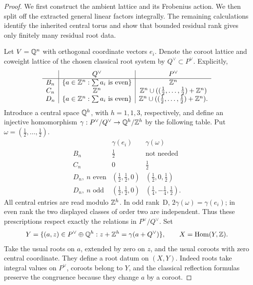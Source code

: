 \begin{proof}
We first construct the ambient lattice and its Frobenius action.
We then split off the extracted general linear factors integrally.
The remaining calculations identify the inherited central torus
and show that bounded residual rank gives only finitely many
residual root data.

Let \(V=\mathbb Q^n\) with orthogonal coordinate vectors \(e_i\).  Denote
the coroot lattice and coweight lattice of the chosen classical root
system by \(Q^\vee\subset P^\vee\).  Explicitly,
\[
\begin{array}{c|c|c}
 &Q^\vee&P^\vee\\ \hline
 B_n&\{a\in\mathbb Z^n:\sum a_i\text{ is even}\}&\mathbb Z^n\\
 C_n&\mathbb Z^n&\mathbb Z^n\cup((\tfrac12,\ldots,\tfrac12)+\mathbb Z^n)\\
 D_n&\{a\in\mathbb Z^n:\sum a_i\text{ is even}\}
     &\mathbb Z^n\cup((\tfrac12,\ldots,\tfrac12)+\mathbb Z^n).
\end{array}
\]
Introduce a central space \(\mathbb Q^h\), with \(h=1,1,3\), respectively,
and define an injective homomorphism
\(\gamma:P^\vee/Q^\vee\to\mathbb Q^h/\mathbb Z^h\) by the following table.
Put \(\omega=(\tfrac12,\ldots,\tfrac12)\).
\begin{equation}\label{fam:lattice-glue}
\begin{array}{c|c|c}
 &\gamma(e_i)&\gamma(\omega)\\ \hline
 B_n&\tfrac12&\text{not needed}\\
 C_n&0&\tfrac12\\
 D_n,\ n\text{ even}&(\tfrac12,\tfrac12,0)
                         &(\tfrac12,0,\tfrac12)\\
 D_n,\ n\text{ odd}&(\tfrac12,\tfrac12,0)
                         &(\tfrac14,-\tfrac14,\tfrac12).
\end{array}
\end{equation}
All central entries are read modulo \(\mathbb Z^h\).  In odd rank~D,
\(2\gamma(\omega)=\gamma(e_i)\); in even rank the two displayed
classes of order two are independent.  Thus these prescriptions
respect exactly the relations in \(P^\vee/Q^\vee\).
Set
\begin{equation}\label{fam:Y}
 Y=\{(a,z)\in P^\vee\oplus\mathbb Q^h:
                   z+\mathbb Z^h=\gamma(a+Q^\vee)\},
 \qquad X=\operatorname{Hom}(Y,\mathbb Z).
\end{equation}
Take the usual roots on \(a\), extended by zero on \(z\), and the
usual coroots with zero central coordinate.  They define a root datum
on \((X,Y)\).  Indeed roots take integral values on \(P^\vee\),
coroots belong to \(Y\), and the classical reflection formulas
preserve the congruence because they change \(a\) by a coroot.


\end{proof}
